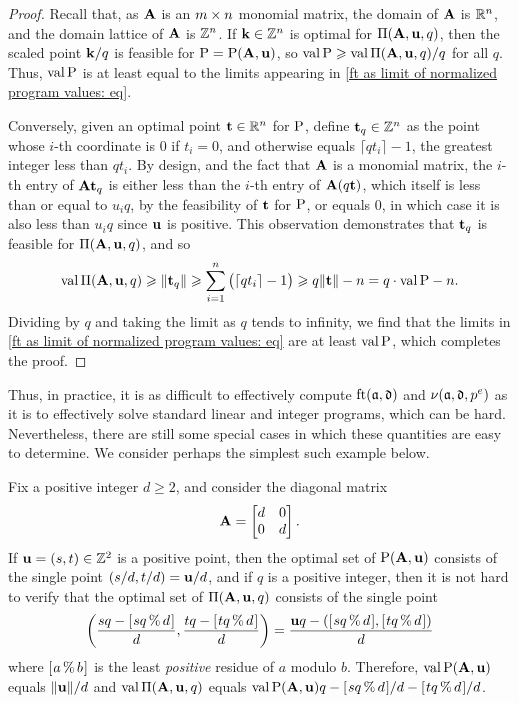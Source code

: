 \documentclass{amsart}
\begin{document}
\begin{proof}
  Recall that, as $\mathbf{A}$ is an $m \times n$ monomial matrix, the domain of $\mathbf{A}$ is $\mathbb{R}^n$, and the domain lattice of $\mathbf{A}$ is $\mathbb{Z}^n$.  If $\mathbf{k} \in \mathbb{Z}^n$ is optimal for $\Pi(\mathbf{A},\mathbf{u},q)$, then the scaled point $\mathbf{k}/q$ is feasible for $\mathrm{P} = \mathrm{P}(\mathbf{A}, \mathbf{u})$, so $\operatorname{val} \mathrm{P} \geqslant \operatorname{val} \Pi(\mathbf{A}, \mathbf{u}, q)/q$ for all $q$.
   Thus, $\operatorname{val} \mathrm{P}$ is at least equal to the limits appearing in \eqref{ft as limit of normalized program values: eq}.

   Conversely, given an optimal point $\mathbf{t} \in \mathbb{R}^n$ for $\mathrm{P}$,
   define $\mathbf{t}_q \in \mathbb{Z}^n$ as the point whose $i$-th coordinate is $0$ if $t_i=0$, and otherwise equals $\lceil q t_i \rceil - 1$, the greatest integer less than $q t_i$.
   By design, and the fact that $\mathbf{A}$ is a monomial matrix, the $i$-th entry of $\mathbf{A} \mathbf{t}_q$ is either less than the $i$-th entry of $\mathbf{A} (q \mathbf{t})$, which itself is less than or equal to $u_iq$, by the feasibility of $\mathbf{t}$ for $\mathrm{P}$, or equals $0$,  in which case it is also less than $u_i q$ since $\mathbf{u}$ is positive. This observation demonstrates that $\mathbf{t}_q$ is feasible for $\Pi(\mathbf{A}, \mathbf{u}, q)$, and so
   \[\operatorname{val} \Pi(\mathbf{A}, \mathbf{u}, q) \geqslant \| \mathbf{t}_q \| \geqslant \sum_{i=1}^n \big(\lceil q t_i \rceil - 1\big) \geqslant q \| \mathbf{t} \| -n = q \cdot \operatorname{val} \mathrm{P} - n.\]
   Dividing by $q$ and taking the limit as $q$ tends to infinity, we find that the limits in \eqref{ft as limit of normalized program values: eq} are at least $\operatorname{val} \mathrm{P}$, which completes the proof.
\end{proof}

Thus, in practice, it is as difficult to effectively compute $\operatorname{ft}(\mathfrak{a}, \mathfrak{d})$ and $\nu(\mathfrak{a}, \mathfrak{d}, p^e)$ as it is to effectively solve standard linear and integer programs, which can be hard.
Nevertheless, there are still some special cases in which these quantities are easy to determine.
We consider perhaps the simplest such example below.

\begin{example}
\label{concrete-solution-to-LP-IP: E}  
Fix a positive integer $d \ge 2$, and consider the diagonal matrix 
\[ \mathbf{A} = \begin{bmatrix} d & 0 \\ 0 & d \end{bmatrix}. \] 
If $\mathbf{u} = (s, t) \in \mathbb{Z}^2$ is a positive point, then the optimal set of $\mathrm{P}(\mathbf{A},\mathbf{u})$ consists of the single point $(s/d, t/d)= \mathbf{u}/d$, and if $q$ is a positive integer, then it is not hard to verify that the optimal set of $\Pi(\mathbf{A}, \mathbf{u}, q)$ consists of the single point
\[ \left( \frac{s q  - [ \hspace{.01in} s q \, \% \, d \hspace{.01in} ]}{d},  \frac{t q  - [ \hspace{.01in} t q \, \% \, d \hspace{.01in} ]}{d} \right) = \frac{\mathbf{u}q - ([ \hspace{.01in} sq \, \% \, d \hspace{.01in} ], [ \hspace{.01in} tq \, \% \, d \hspace{.01in} ])}{d} \] 
where $[ \hspace{.01in} a \, \% \, b \hspace{.01in} ]$ is the least \emph{positive} residue of $a$ modulo $b$.  Therefore, $\operatorname{val} \mathrm{P}(\mathbf{A},\mathbf{u})$ equals $\| \mathbf{u} \|/d$ and $\operatorname{val} \Pi(\mathbf{A},\mathbf{u},q)$ equals $\operatorname{val} \mathrm{P}(\mathbf{A},\mathbf{u})  q - [ \hspace{.01in} sq \, \% \, d \hspace{.01in} ]/d-[ \hspace{.01in} tq \, \% \, d \hspace{.01in} ]/d$.
\end{example}
\end{document}
